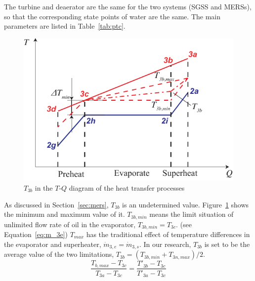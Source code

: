 The turbine and deaerator are the same for the two systems (SGSS and MERSs), so that the corresponding state points of water are the same. The main parameters are listed in Table~\ref{tab:ptc}.

\noindent \begin{figure}[htbp]
\begin{center}
	\includegraphics[width = 0.7\columnwidth]{fig/T3b}
	\caption{$T_{3b}$ in the $T$-$Q$ diagram of the heat transfer processes}
	\label{fig:T3b}
\end{center}
\end{figure}

As discussed in Section~\ref{sec:mers}, $T_{3b}$ is an undetermined value. Figure~\ref{fig:T3b} shows the minimum and maximum value of it. $T_{3b,min}$ means the limit situation of unlimited flow rate of oil in the evaporator, $T_{3b,min} = T_{3c}$. (see Equation~\ref{eq:m_3e}) $T_{max}$ has the traditional effect of temperature differences in the evaporator and superheater, $\dot{m}_{3,e} = \dot{m}_{3,s}$. In our research, $T_{3b}$ is set to be the average value of the two limitations, $T_{3b} = (T_{3b,min} + T_{3n,max}) / 2$.
\begin{equation}
  \dfrac{T_{b,max}-T_{3c}}{T_{3a} - T_{3c}} = \dfrac{T'_{3b} - T_{3c}}{T'_{3a} - T_{3c}}
\end{equation}


